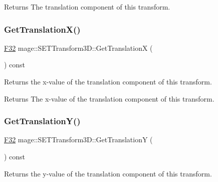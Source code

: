 \begin{DoxyReturn}{Returns}
The translation component of this transform. 
\end{DoxyReturn}
\mbox{\label{classmage_1_1_s_e_t_transform3_d_a76992521d11991bc78f8430725f784ca}} 
\subsubsection{\texorpdfstring{Get\+Translation\+X()}{GetTranslationX()}}
{\footnotesize\ttfamily \mbox{\hyperlink{namespacemage_aa97e833b45f06d60a0a9c4fc22ae02c0}{F32}} mage\+::\+S\+E\+T\+Transform3\+D\+::\+Get\+TranslationX (\begin{DoxyParamCaption}{ }\end{DoxyParamCaption}) const\hspace{0.3cm}{\ttfamily [noexcept]}}

Returns the x-\/value of the translation component of this transform.

\begin{DoxyReturn}{Returns}
The x-\/value of the translation component of this transform. 
\end{DoxyReturn}
\mbox{\label{classmage_1_1_s_e_t_transform3_d_a92dac47943f13843094946639444a5ed}} 
\subsubsection{\texorpdfstring{Get\+Translation\+Y()}{GetTranslationY()}}
{\footnotesize\ttfamily \mbox{\hyperlink{namespacemage_aa97e833b45f06d60a0a9c4fc22ae02c0}{F32}} mage\+::\+S\+E\+T\+Transform3\+D\+::\+Get\+TranslationY (\begin{DoxyParamCaption}{ }\end{DoxyParamCaption}) const\hspace{0.3cm}{\ttfamily [noexcept]}}

Returns the y-\/value of the translation component of this transform.

